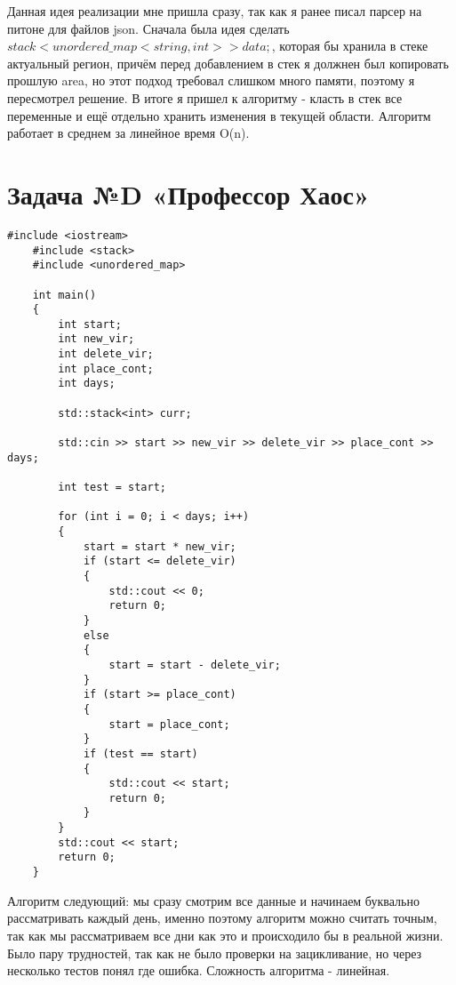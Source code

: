 \documentclass{article}
\begin{document}
Данная идея реализации мне пришла сразу, так как я ранее писал парсер на питоне для файлов json. 
Сначала была идея сделать $stack<unordered\_map< string, int > > data;$, которая бы хранила в стеке актуальный регион, причём перед добавлением в стек я должнен был копировать прошлую area, но этот подход требовал слишком много памяти, поэтому я пересмотрел решение.
В итоге я пришел к алгоритму - класть в стек все переменные и ещё отдельно хранить изменения в текущей области. Алгоритм работает в среднем за линейное время O(n).
\section{Задача №D «Профессор Хаос»}
\begin{lstlisting}[frame=single, basicstyle=\ttfamily, breaklines=true, breakatwhitespace=true, postbreak=\mbox{\textcolor{red}{$\hookrightarrow$}\space}]
    #include <iostream>
    #include <stack>
    #include <unordered_map>
    
    int main()
    {
        int start;
        int new_vir;
        int delete_vir;
        int place_cont;
        int days;
    
        std::stack<int> curr;
    
        std::cin >> start >> new_vir >> delete_vir >> place_cont >> days;
    
        int test = start;
    
        for (int i = 0; i < days; i++)
        {
            start = start * new_vir;
            if (start <= delete_vir)
            {
                std::cout << 0;
                return 0;
            }
            else
            {
                start = start - delete_vir;
            }
            if (start >= place_cont)
            {
                start = place_cont;
            }
            if (test == start)
            {
                std::cout << start;
                return 0;
            }
        }
        std::cout << start;
        return 0;
    }
\end{lstlisting}
Алгоритм следующий: мы сразу смотрим все данные и начинаем буквально рассматривать каждый день, именно поэтому алгоритм можно считать точным, так как мы рассматриваем все дни как это и происходило бы в реальной жизни. Было пару трудностей, так как не было проверки на зацикливание, но через несколько тестов понял где ошибка. Сложность алгоритма - линейная.
\end{document}
